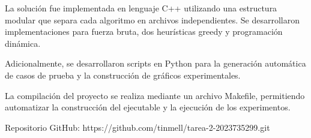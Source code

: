 La solución fue implementada en lenguaje C++ utilizando una estructura modular que separa cada algoritmo en archivos independientes. Se desarrollaron implementaciones para fuerza bruta, dos heurísticas greedy y programación dinámica.

Adicionalmente, se desarrollaron scripts en Python para la generación automática de casos de prueba y la construcción de gráficos experimentales.

La compilación del proyecto se realiza mediante un archivo Makefile, permitiendo automatizar la construcción del ejecutable y la ejecución de los experimentos.

Repositorio GitHub:
https://github.com/tinmell/tarea-2-2023735299.git
